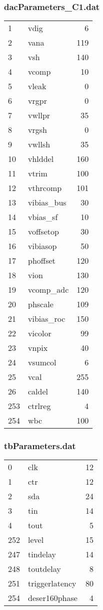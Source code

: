 \subsubsection{dacParameters\_C1.dat}
\ubuntu
\begin{tabular}{llr}
\hline
1	&	vdig	&	6	\\
2	&	vana	&	119	\\
3	&	vsh	&	140	\\
4	&	vcomp	&	10	\\
5	&	vleak	&	0	\\
6	&	vrgpr	&	0	\\
7	&	vwllpr	&	35	\\
8	&	vrgsh	&	0	\\
9	&	vwllsh	&	35	\\
10	&	vhlddel	&	160	\\
11	&	vtrim	&	100	\\
12	&	vthrcomp	&	101	\\
13	&	vibias\_bus	&	30	\\
14	&	vbias\_sf	&	10	\\
15	&	voffsetop	&	30	\\
16	&	vibiasop	&	50	\\
17	&	phoffset	&	120	\\
18	&	vion	&	130	\\
19	&	vcomp\_adc	&	120	\\
20	&	phscale	&	109	\\
21	&	vibias\_roc	&	150	\\
22	&	vicolor	&	99	\\
23	&	vnpix	&	40	\\
24	&	vsumcol	&	6	\\
25	&	vcal	&	255	\\
26	&	caldel	&	140	\\
253	&	ctrlreg	&	4	\\
254	&	wbc	&	100	\\\hline
\end{tabular}
\subsubsection{tbParameters.dat}
\ubuntu
\begin{tabular}{llr}
\hline
0	&	clk	&	12	\\
1	&	ctr	&	12	\\
2	&	sda	&	24	\\
3	&	tin	&	14	\\
4	&	tout	&	5	\\
252	&	level	&	15	\\
247	&	tindelay	&	14	\\
248	&	toutdelay	&	8	\\
251	&	triggerlatency	&	80	\\
254	&	deser160phase	&	4	\\\hline
\end{tabular}
